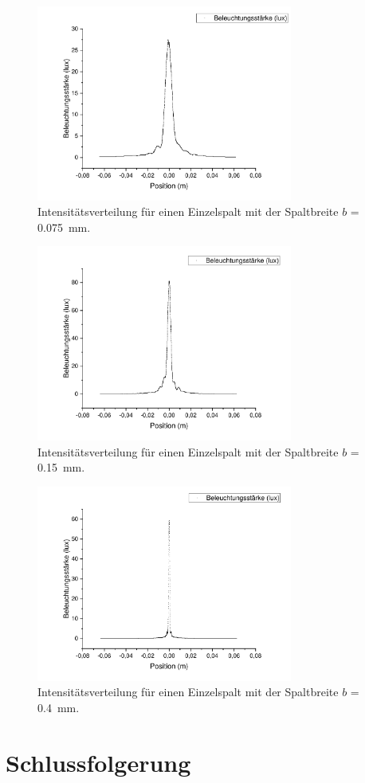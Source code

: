\documentclass[
	a4paper,
	12pt,
	pagesize,
	ngerman
]{scrartcl}
\begin{document}
	\begin{figure}[H]
		\includegraphics[width=0.75\textwidth]{Einzelspalt0-075mm}
		\centering
		\caption{Intensitätsverteilung für einen Einzelspalt mit der Spaltbreite $b$ = \SI{0,075}{mm}.}
		\label{Einzelspalt0-075mm}
		\centering
	\end{figure}
	\begin{figure}[H]
		\includegraphics[width=0.75\textwidth]{Einzelspalt0-150mm}
		\centering
		\caption{Intensitätsverteilung für einen Einzelspalt mit der Spaltbreite $b$ = \SI{0,15}{mm}.}
		\label{Einzelspalt0-150mm}
		\centering
	\end{figure}
	\begin{figure}[H]
		\includegraphics[width=0.75\textwidth]{Einzelspalt0-400mm}
		\centering
		\caption{Intensitätsverteilung für einen Einzelspalt mit der Spaltbreite $b$ = \SI{0,4}{mm}.}
		\label{Einzelspalt0-400mm}
		\centering
	\end{figure}
	\section{Schlussfolgerung}
	
	\printbibliography
\end{document}
